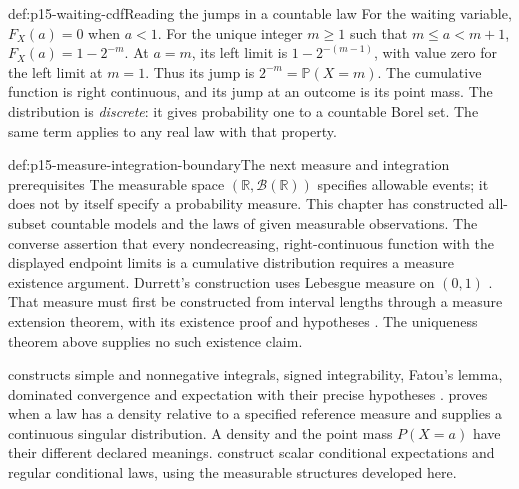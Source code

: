 \begin{hbexample}{def:p15-waiting-cdf}{Reading the jumps in a countable law}
For the waiting variable, \(F_X(a)=0\) when \(a<1\). For the unique
integer \(m\geq1\) such that \(m\leq a<m+1\),
\(F_X(a)=1-2^{-m}\). At \(a=m\), its left limit is
\(1-2^{-(m-1)}\), with value zero for the left limit at \(m=1\).
Thus its jump is \(2^{-m}=\mathbb P(X=m)\). The cumulative function
is right continuous, and its jump at an outcome is its point mass.
The distribution is \emph{discrete}: it gives probability one to a
countable Borel set. The same term applies to any real law with that property.
\end{hbexample}

\begin{proofboundary}{def:p15-measure-integration-boundary}{The next measure and integration prerequisites}
The measurable space \((\mathbb R,\mathcal B(\mathbb R))\) specifies
allowable events; it does not by itself specify a probability measure.
This chapter has constructed all-subset countable models and the laws of
given measurable observations. The converse assertion that every
nondecreasing, right-continuous function with the displayed endpoint limits
is a cumulative distribution requires a measure existence argument.
Durrett's construction uses Lebesgue measure on \((0,1)\)
\cite[thm.~1.2.2, p.~11]{DurrettPTEAuthor2019}.
That measure must first be constructed from interval lengths through a
measure extension theorem, with its existence proof and hypotheses
\cite[thms.~1.1.4, 1.1.9; app.~A.1]{DurrettPTEAuthor2019}.
The uniqueness theorem above supplies no such existence claim.

 constructs simple and nonnegative
integrals, signed integrability, Fatou's lemma, dominated convergence and
expectation with their precise hypotheses
\cite[secs.~1.4--1.6]{DurrettPTEAuthor2019}.
 proves when a law has a density relative
to a specified reference measure and supplies a continuous singular
distribution. A density and the point mass \(P(X=a)\) have their
different declared meanings.
construct scalar conditional expectations and regular conditional laws,
using the measurable structures developed here.
\end{proofboundary}
